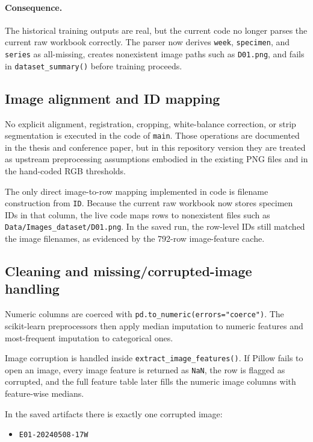 \documentclass[11pt]{article}
\begin{document}
\paragraph{Consequence.}
The historical training outputs are real, but the current code no longer parses the current raw workbook correctly. The parser now derives \texttt{week}, \texttt{specimen}, and \texttt{series} as all-missing, creates nonexistent image paths such as \texttt{D01.png}, and fails in \texttt{dataset\_summary()} before training proceeds.

\subsection{Image alignment and ID mapping}
No explicit alignment, registration, cropping, white-balance correction, or strip segmentation is executed in the code of \texttt{main}. Those operations are documented in the thesis and conference paper, but in this repository version they are treated as upstream preprocessing assumptions embodied in the existing PNG files and in the hand-coded RGB thresholds.

The only direct image-to-row mapping implemented in code is filename construction from \texttt{ID}. Because the current raw workbook now stores specimen IDs in that column, the live code maps rows to nonexistent files such as \texttt{Data/Images\_dataset/D01.png}. In the saved run, the row-level IDs still matched the image filenames, as evidenced by the 792-row image-feature cache.

\subsection{Cleaning and missing/corrupted-image handling}
Numeric columns are coerced with \texttt{pd.to\_numeric(errors="coerce")}. The scikit-learn preprocessors then apply median imputation to numeric features and most-frequent imputation to categorical ones.

Image corruption is handled inside \texttt{extract\_image\_features()}. If Pillow fails to open an image, every image feature is returned as \texttt{NaN}, the row is flagged as corrupted, and the full feature table later fills the numeric image columns with feature-wise medians.

In the saved artifacts there is exactly one corrupted image:
\begin{itemize}
  \item \texttt{E01-20240508-17W}
\end{itemize}
\end{document}

